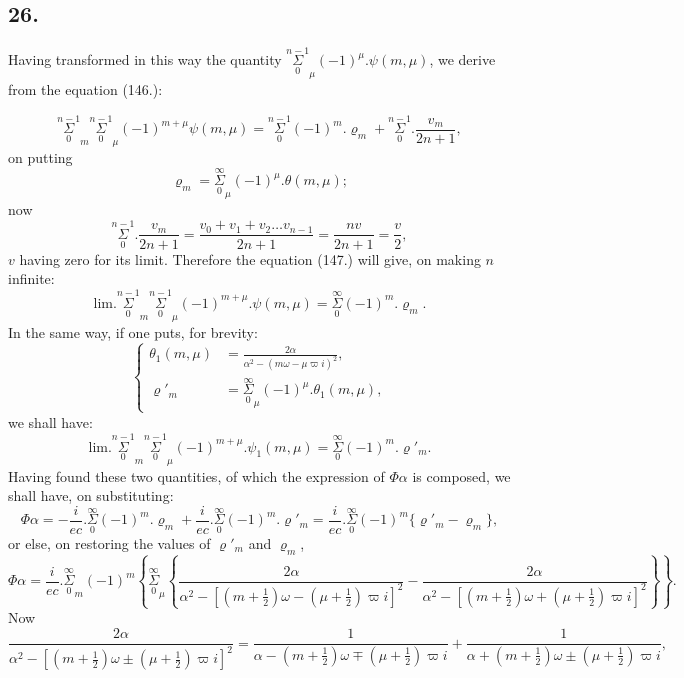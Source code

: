 \documentclass{article}
\begin{document}
\subsection*{26.}

Having transformed in this way the quantity $\overset{n-1}{\underset{0}{\Sigma}}_{\mu}(-1)^{\mu}.\psi(m,\mu)$, we derive from the equation (146.):

\[ \overset{n-1}{\underset{0}{\Sigma}}_{m}\overset{n-1}{\underset{0}{\Sigma}}_{\mu}(-1)^{m+\mu}\psi(m,\mu)=\overset{n-1}{\underset{0}{\Sigma}}(-1)^{m}.\varrho_{m}+\overset{n-1}{\underset{0}{\Sigma}}.\frac{v_{m}}{2n+1}, \tag{147.} \]
on putting
\[ \varrho_{m}=\overset{\infty}{\underset{0}{\Sigma}}_{\mu}(-1)^{\mu}.\theta(m,\mu); \tag{148.} \]
now
\[ \overset{n-1}{\underset{0}{\Sigma}}.\frac{v_{m}}{2n+1}=\frac{v_{0}+v_{1}+v_{2}\ldots v_{n-1}}{2n+1}=\frac{nv}{2n+1}=\frac{v}{2}, \]
$v$ having zero for its limit. Therefore the equation (147.) will give, on making $n$ infinite:
\[ \text{lim.}\overset{n-1}{\underset{0}{\Sigma}}_{m}\overset{n-1}{\underset{0}{\Sigma}}_{\mu}(-1)^{m+\mu}.\psi(m,\mu)=\overset{\infty}{\underset{0}{\Sigma}}(-1)^{m}.\varrho_{m}. \tag{149.} \]
In the same way, if one puts, for brevity:
\[ \left\{\begin{aligned}\theta_{1}(m,\mu)&=\frac{2\alpha}{\alpha^{2}-(m\omega-\mu\varpi i)^{2}},\\ \varrho'_{m}&=\overset{\infty}{\underset{0}{\Sigma}}_{\mu}(-1)^{\mu}.\theta_{1}(m,\mu),\end{aligned}\right. \tag{150.} \]
we shall have:
\[ \text{lim.}\overset{n-1}{\underset{0}{\Sigma}}_{m}\overset{n-1}{\underset{0}{\Sigma}}_{\mu}(-1)^{m+\mu}.\psi_{1}(m,\mu)=\overset{\infty}{\underset{0}{\Sigma}}(-1)^{m}.\varrho'_{m}. \tag{151.} \]
Having found these two quantities, of which the expression of $\Phi\alpha$ is composed, we shall have, on substituting:
\[ \Phi\alpha=-\frac{i}{ec}.\overset{\infty}{\underset{0}{\Sigma}}(-1)^{m}.\varrho_{m}+\frac{i}{ec}.\overset{\infty}{\underset{0}{\Sigma}}(-1)^{m}.\varrho'_{m}=\frac{i}{ec}.\overset{\infty}{\underset{0}{\Sigma}}(-1)^{m}\{\varrho'_{m}-\varrho_{m}\}, \]
or else, on restoring the values of $\varrho'_{m}$ and $\varrho_{m}$,
\[ \Phi\alpha=\frac{i}{ec}.\overset{\infty}{\underset{0}{\Sigma}}_{m}(-1)^{m}\left\{\overset{\infty}{\underset{0}{\Sigma}}_{\mu}\left\{\frac{2\alpha}{\alpha^{2}-[(m+\tfrac{1}{2})\omega-(\mu+\tfrac{1}{2})\varpi i]^{2}}-\frac{2\alpha}{\alpha^{2}-[(m+\tfrac{1}{2})\omega+(\mu+\tfrac{1}{2})\varpi i]^{2}}\right\}\right\}. \tag{152.} \]
Now
\[ \frac{2\alpha}{\alpha^{2}-[(m+\tfrac{1}{2})\omega\pm(\mu+\tfrac{1}{2})\varpi i]^{2}}=\frac{1}{\alpha-(m+\tfrac{1}{2})\omega\mp(\mu+\tfrac{1}{2})\varpi i}+\frac{1}{\alpha+(m+\tfrac{1}{2})\omega\pm(\mu+\tfrac{1}{2})\varpi i}, \]
\end{document}
